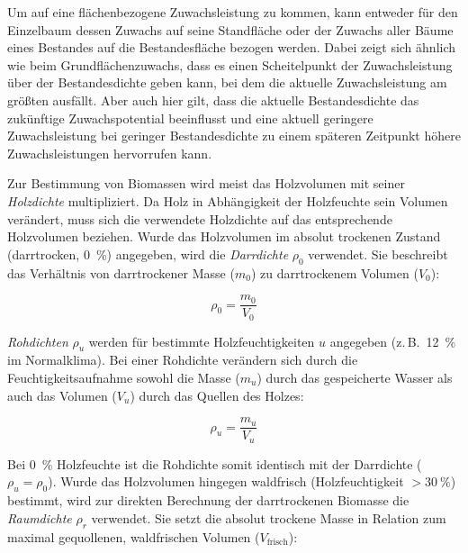 \documentclass[twocolumn, paper=a4, fontsize=10pt]{scrartcl}
\begin{document}
Um auf eine flächenbezogene Zuwachsleistung zu kommen, kann entweder für den
Einzelbaum dessen Zuwachs auf seine Standfläche oder der Zuwachs aller Bäume
eines Bestandes auf die Bestandesfläche bezogen werden. Dabei zeigt sich
ähnlich wie beim Grundflächenzuwachs, dass es einen Scheitelpunkt der
Zuwachsleistung über der Bestandesdichte geben kann, bei dem die aktuelle
Zuwachsleistung am größten ausfällt. Aber auch hier gilt, dass die aktuelle
Bestandesdichte das zukünftige Zuwachspotential beeinflusst und eine aktuell
geringere Zuwachsleistung bei geringer Bestandesdichte zu einem späteren
Zeitpunkt höhere Zuwachsleistungen hervorrufen kann.

Zur Bestimmung von Biomassen wird meist das Holzvolumen mit seiner
\emph{Holzdichte} multipliziert. Da Holz in Abhängigkeit der
Holzfeuchte sein Volumen verändert, muss sich die verwendete Holzdichte auf das
entsprechende Holzvolumen beziehen. Wurde das Holzvolumen im absolut trockenen
Zustand (darrtrocken, \qty{0}{\%}) angegeben, wird die
\emph{Darrdichte}
$\rho_0$ verwendet. Sie beschreibt das Verhältnis von darrtrockener Masse ($m_0$) zu darrtrockenem Volumen ($V_0$):

\begin{equation}
  \rho_0 = \frac{m_0}{V_0}
  \label{eq:darrdichte}
\end{equation}

\emph{Rohdichten}
$\rho_u$ werden für bestimmte Holzfeuchtigkeiten $u$ angegeben (z.\,B.\ \qty{12}{\%} im Normalklima). Bei einer Rohdichte verändern sich durch die Feuchtigkeitsaufnahme sowohl die Masse ($m_u$) durch das gespeicherte Wasser als auch das Volumen ($V_u$) durch das Quellen des Holzes:

\begin{equation}
  \rho_u = \frac{m_u}{V_u}
  \label{eq:rohdichte}
\end{equation}

Bei \qty{0}{\%} Holzfeuchte ist die Rohdichte somit identisch mit der Darrdichte ($\rho_u = \rho_0$). Wurde das Holzvolumen hingegen waldfrisch (Holzfeuchtigkeit $>\qty{30}{\%}$) bestimmt, wird zur direkten Berechnung der darrtrockenen Biomasse die
\emph{Raumdichte}
$\rho_r$ verwendet. Sie setzt die absolut trockene Masse in Relation zum maximal gequollenen, waldfrischen Volumen ($V_{\text{frisch}}$):
\end{document}
